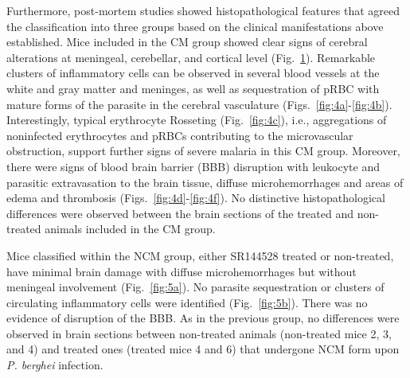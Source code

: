 \documentclass[empirical, authordate]{jote-new-article}
\begin{document}
\begin{figure}[t]
\begin{fullwidth}
{    }
    \caption{}
    \label{fig:4}
  \end{fullwidth}
\end{figure}

Furthermore, post-mortem studies showed histopathological features that agreed the classification into three groups based on the clinical manifestations above established. Mice included in the CM group showed clear signs of cerebral alterations at meningeal, cerebellar, and cortical level (Fig.~\ref{fig:4}). Remarkable clusters of inflammatory cells can be observed in several blood vessels at the white and gray matter and meninges, as well as sequestration of pRBC with mature forms of the parasite in the cerebral vasculature (Figs.~\ref{fig:4a}-\ref{fig:4b}). Interestingly, typical erythrocyte Rosseting (Fig.~\ref{fig:4c}), i.e., aggregations of noninfected erythrocytes and pRBCs contributing to the microvascular obstruction, support further signs of severe malaria \parencite{Ross2007} in this CM group. Moreover, there were signs of blood brain barrier (BBB) disruption with leukocyte and parasitic extravasation to the brain tissue, diffuse microhemorrhages and areas of edema and thrombosis (Figs.~\ref{fig:4d}-\ref{fig:4f}). No distinctive histopathological differences were observed between the brain sections of the treated and non-treated animals included in the CM group.

Mice classified within the NCM group, either SR144528 treated or non-treated, have minimal brain damage with diffuse microhemorrhages but without meningeal involvement (Fig.~\ref{fig:5a}). No parasite sequestration or clusters of circulating inflammatory cells were identified (Fig.~\ref{fig:5b}). There was no evidence of disruption of the BBB. As in the previous group, no differences were observed in brain sections between non-treated animals (non-treated mice 2, 3, and 4) and treated ones (treated mice 4 and 6) that undergone NCM form upon \emph{P. berghei} infection.
\end{document}
